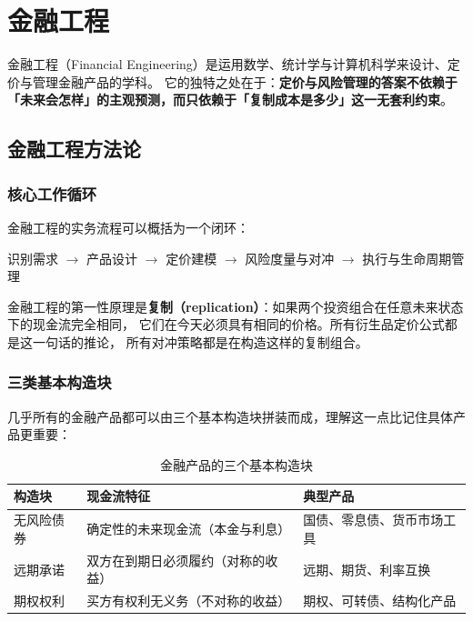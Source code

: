 \chapter{金融工程}

金融工程（Financial Engineering）是运用数学、统计学与计算机科学来设计、定价与管理金融产品的学科。
它的独特之处在于：\textbf{定价与风险管理的答案不依赖于「未来会怎样」的主观预测，而只依赖于「复制成本是多少」这一无套利约束}。

\section{金融工程方法论}

\subsection{核心工作循环}

金融工程的实务流程可以概括为一个闭环：

\begin{center}
\sffamily 识别需求 $\to$ 产品设计 $\to$ 定价建模 $\to$ 风险度量与对冲 $\to$ 执行与生命周期管理
\end{center}

\begin{keybox}
金融工程的第一性原理是\textbf{复制（replication）}：如果两个投资组合在任意未来状态下的现金流完全相同，
它们在今天必须具有相同的价格。所有衍生品定价公式都是这一句话的推论，
所有对冲策略都是在构造这样的复制组合。
\end{keybox}

\subsection{三类基本构造块}

几乎所有的金融产品都可以由三个基本构造块拼装而成，理解这一点比记住具体产品更重要：

\begin{table}[htbp]
\centering
\caption{金融产品的三个基本构造块}\label{tab:04-blocks}
\tablefont
\begin{tabularx}{\textwidth}{@{}L{2.6cm}Y L{4.4cm}@{}}
\toprule
\textbf{构造块} & \textbf{现金流特征} & \textbf{典型产品} \\
\midrule
无风险债券 & 确定性的未来现金流（本金与利息） & 国债、零息债、货币市场工具 \\
远期承诺 & 双方在到期日必须履约（对称的收益） & 远期、期货、利率互换 \\
期权权利 & 买方有权利无义务（不对称的收益） & 期权、可转债、结构化产品 \\
\bottomrule
\end{tabularx}
\end{table}


